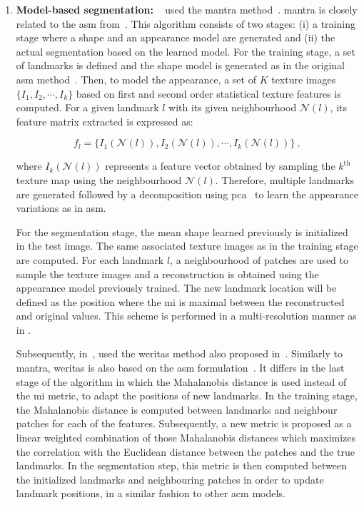 \begin{enumerate}[leftmargin=*]
\item[] \textbf{Model-based segmentation:}
\citeauthor{Viswanath2009}~\cite{Viswanath2008a,Viswanath2009} used the
\acs{mantra} method~\cite{Toth2008}.
\Acf{mantra} \cite{Toth2008} is closely related to the \ac{asm}
from~\cite{Cootes1995}.
This algorithm consists of two stages: (i) a training stage where a shape and
an appearance model are generated and (ii) the actual segmentation based on the
learned model.
For the training stage, a set of landmarks is defined and the shape model is
generated as in the original \ac{asm} method~\cite{Cootes1995}.
Then, to model the appearance, a set of $K$ texture images
$\{I_1,I_2,\cdots,I_k\}$ based on first and second order statistical texture
features is computed.
For a given landmark $l$ with its given neighbourhood $\mathcal{N}(l)$, its
feature matrix extracted is expressed as:

\begin{equation}
  f_l = \{ I_1(\mathcal{N}(l)), I_2(\mathcal{N}(l)), \cdots, I_k(\mathcal{N}(l)) \} \ ,
  \label{eq:mantra1}
\end{equation}

\noindent where $I_k(\mathcal{N}(l))$ represents a feature vector obtained by
sampling the $k^{\text{th}}$ texture map using the neighbourhood
$\mathcal{N}(l)$.
Therefore, multiple landmarks are generated followed by a decomposition using
\ac{pca}~\cite{Pearson1901} to learn the appearance variations as in \ac{asm}.

For the segmentation stage, the mean shape learned previously is initialized in
the test image.
The same associated texture images as in the training stage are computed.
For each landmark $l$, a neighbourhood of patches are used to sample the
texture images and a reconstruction is obtained using the appearance model
previously trained.
The new landmark location will be defined as the position where the \ac{mi} is
maximal between the reconstructed and original values.
This scheme is performed in a multi-resolution manner as in \cite{Cootes1995}.

Subsequently, \citeauthor{Viswanath2012} in~\cite{Viswanath2012}, used the
\ac{weritas} method also proposed in~\citeauthor{Toth2009}.
Similarly to \ac{mantra}, \ac{weritas} is also based on the \ac{asm}
formulation~\cite{Toth2009}.
It differs in the last stage of the algorithm in which the Mahalanobis distance
is used instead of the \ac{mi} metric, to adapt the positions of new
landmarks.
In the training stage, the Mahalanobis distance is computed between landmarks
and neighbour patches for each of the features.
Subsequently, a new metric is proposed as a linear weighted combination of
those Mahalanobis distances which maximizes the correlation with the Euclidean
distance between the patches and the true landmarks.
In the segmentation step, this metric is then computed between the initialized
landmarks and neighbouring patches in order to update landmark positions, in a
similar fashion to other \ac{acm} models.


\end{enumerate}
